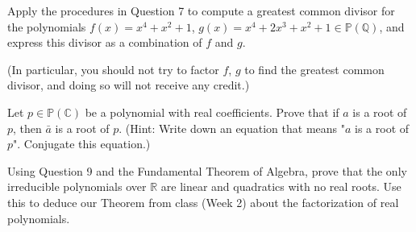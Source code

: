 \documentclass{article}
\theoremstyle{plain} %
\numberwithin{thm}{section} %
\theoremstyle{definition}
\begin{document}
    \newpage
    \begin{question}{8}
        Apply the procedures in Question 7 to compute a greatest common divisor for the polynomials
        \(f(x) = x^4 + x^2 + 1\), \(g(x) = x^4 + 2x^3 + x^2 + 1 \in \mathbb{P}(\mathbb{Q})\), and express this divisor as a combination
        of \(f\) and \(g\).

        (In particular, you should not try to factor \(f\), \(g\) to find the greatest common divisor, and doing
        so will not receive any credit.)
    \end{question}
    \newpage
    \begin{question}{9}
        Let $p \in \mathbb{P}(\mathbb{C})$ be a polynomial with real coefficients. Prove that if $a$ is a root of $p$, then $\bar{a}$ is a root of $p$. (Hint: Write down an equation that means "$a$ is a root of $p$". Conjugate this equation.)
    \end{question}
    \newpage
    \begin{question}{10}
        Using Question 9 and the Fundamental Theorem of Algebra, prove that the only irreducible 
        polynomials over $\mathbb{R}$ are linear and quadratics with no real roots. Use this to deduce our Theorem from class (Week 2) about the factorization of real polynomials.
    \end{question}
\end{document}
